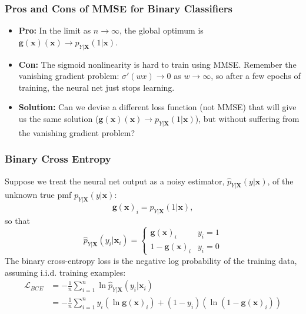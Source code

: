 \begin{frame}
  \frametitle{Pros and Cons of MMSE for Binary Classifiers}

  \begin{itemize}
  \item {\bf Pro:} In the limit as $n\rightarrow\infty$, the global optimum is
    $\mathbf{g}(\mathbf{x})(\mathbf{x})\rightarrow p_{Y|\mathbf{X}}\left(1|\mathbf{x}\right)$.
  \item {\bf Con:} The sigmoid nonlinearity is hard to train using
    MMSE.  Remember the vanishing gradient problem: $\sigma'(wx)\rightarrow 0$
    as $w\rightarrow\infty$, so after a few epochs of training,
    the neural net just stops learning.
  \item {\bf Solution:} Can we devise a different loss function (not
    MMSE) that will give us the same solution
    ($\mathbf{g}(\mathbf{x})(\mathbf{x})\rightarrow p_{Y|\mathbf{X}}\left(1|\mathbf{x}\right)$), but
    without suffering from the vanishing gradient problem?
  \end{itemize}
\end{frame}

\begin{frame}
  \frametitle{Binary Cross Entropy}

  Suppose we treat the neural net output as a noisy
  estimator, $\hat{p}_{Y|\mathbf{X}}(y|\mathbf{x})$, of the unknown true pmf
  $p_{Y|\mathbf{X}}\left(y|\mathbf{x}\right)$:
  \[
  \mathbf{g}(\mathbf{x})_i = \hat{p}_{Y|\mathbf{X}}(1|\mathbf{x}),
  \]
  so that
  \begin{displaymath}
    \hat{p}_{Y|\mathbf{X}}(y_i|\mathbf{x}_i)
    =\begin{cases}\mathbf{g}(\mathbf{x})_i & y_i=1\\1-\mathbf{g}(\mathbf{x})_i & y_i=0\end{cases}
  \end{displaymath}
  The binary cross-entropy loss is the negative log probability of the
  training data, assuming i.i.d. training examples:
  \begin{align*}
    {\mathcal L}_{BCE} &= -\frac{1}{n}\sum_{i=1}^n \ln\hat{p}_{Y|\mathbf{X}}(y_i|\mathbf{x}_i)\\
    &= -\frac{1}{n}\sum_{i=1}^n
    y_i\left(\ln\mathbf{g}(\mathbf{x})_i\right)+
    (1-y_i)\left(\ln(1-\mathbf{g}(\mathbf{x})_i)\right)
  \end{align*}
\end{frame}

